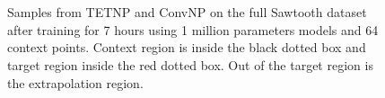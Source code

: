 \documentclass[../../main.tex]{subfiles}
\begin{document}
\begin{figure}[H]
    \centering
    \\
    \\
    \caption{Samples from TETNP and ConvNP on the full Sawtooth dataset after training for 7 hours using 1 million parameters models and 64 context points. Context region is inside the black dotted box and target region inside the red dotted box. Out of the target region is the extrapolation region.}
    \label{fig:full-saw-preds}
\end{figure}
\end{document}
